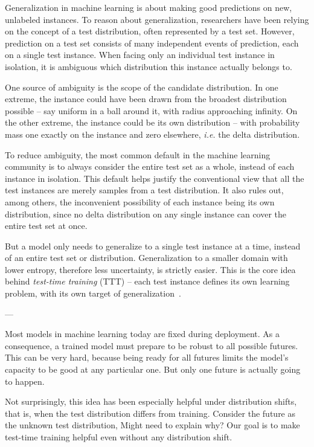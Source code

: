 Generalization in machine learning is about making good predictions on new, unlabeled instances.
To reason about generalization, researchers have been relying on the concept of a test distribution, often represented by a test set.
However, prediction on a test set consists of many independent events of prediction, each on a single test instance.
When facing only an individual test instance in isolation,
it is ambiguous which distribution this instance actually belongs to.

One source of ambiguity is the scope of the candidate distribution.
In one extreme, the instance could have been drawn from the broadest distribution possible -- say uniform in a ball around it, with radius approaching infinity.
On the other extreme, the instance could be its own distribution -- with probability mass one exactly on the instance and zero elsewhere, \textit{i.e.} the delta distribution.

To reduce ambiguity, the most common default in the machine learning community is to always consider the entire test set as a whole, instead of each instance in isolation.
This default helps justify the conventional view that all the test instances are merely samples from a test distribution.
It also rules out, among others, the inconvenient possibility of each instance being its own distribution, since no delta distribution on any single instance can cover the entire test set at once.

But a model only needs to generalize to a single test instance at a time, instead of an entire test set or distribution.
Generalization to a smaller domain with lower entropy, therefore less uncertainty, is strictly easier.
This is the core idea behind \emph{test-time training} (TTT) -- each test instance defines its own learning problem, with its own target of generalization~\citep{sun2020test}.


---

Most models in machine learning today are fixed during deployment. 
As a consequence, a trained model must prepare to be robust to all possible futures. 
This can be very hard, because being ready for all futures limits the model’s capacity to be good at any particular one. 
But only one future is actually going to happen. 

Not surprisingly, this idea has been especially helpful under distribution shifts, that is, when the test distribution differs from training.
Consider the future as the unknown test distribution,
Might need to explain why?
Our goal is to make test-time training helpful even without any distribution shift. 

